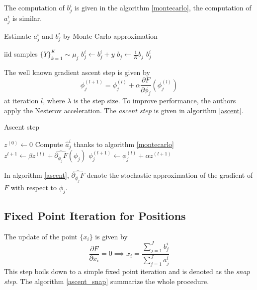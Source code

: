 The computation of $b_j^i$ is given in the algorithm \ref{montecarlo}, the computation of $a_j^i$ is similar. 

\begin{algorithm}[H]
    \caption{Estimate $a_j^i$ and $b_j^i$ by Monte Carlo approximation}\label{montecarlo}
    \begin{algorithmic}[1] %
        \REQUIRE iid samples $\lbrace Y\rbrace_{k=1}^K \sim \mu_j$ 
                \STATE $b_j^i \gets b_j^i + y$
            \ENDIF 
        \ENDFOR
        \STATE $b_j \gets \frac{1}{K} b_j$
        \RETURN $b_j^i$
    \end{algorithmic}
\end{algorithm}

The well known gradient ascent step is given by $$ \phi_j^{(l+1)} = \phi_j^{(l)} + \alpha \frac{\partial F}{\partial \phi_j}(\phi_j^{(l)}) $$
at iteration $l$, where $\lambda$ is the step size. To improve performance, the authors apply the Nesterov acceleration. The \textit{ascent step} is given in algorithm \ref{ascent}.

\begin{algorithm}[H]
    \caption{Ascent step}\label{ascent}
    \begin{algorithmic}[1]
        \STATE $z^{(0)} \gets 0$
        \STATE Compute $\hat{a}_j^i$ thanks to algorithm \ref{montecarlo}
        \STATE $z^{l+1} \gets \beta z^{(l)} + \widehat{\partial_{\phi_j}F}(\phi_j)$ 
        \STATE $\phi_j^{(l+1)} \gets \phi_j^{(l)} + \alpha z^{(l+1)}$
        \ENDWHILE
        \ENDFOR
    \end{algorithmic}
\end{algorithm}
In algorithm \ref{ascent}, $\widehat{\partial_{\phi_j}F}$ denote the stochastic approximation of the gradient of $F$ with respect to $\phi_j$. 

\subsection{Fixed Point Iteration for Positions}

The update of the point $\lbrace x_i \rbrace$ is given by 
$$
\frac{\partial F}{\partial x_i} = 0 \implies x_i = \frac{\sum_{j=1}^J b_j^i }{\sum_{j=1}^{J}a_j^i}
$$
This step boils down to a simple fixed point iteration and is denoted as the \textit{snap step}.
The algorithm \ref{ascent_snap} summarize the whole procedure. 

